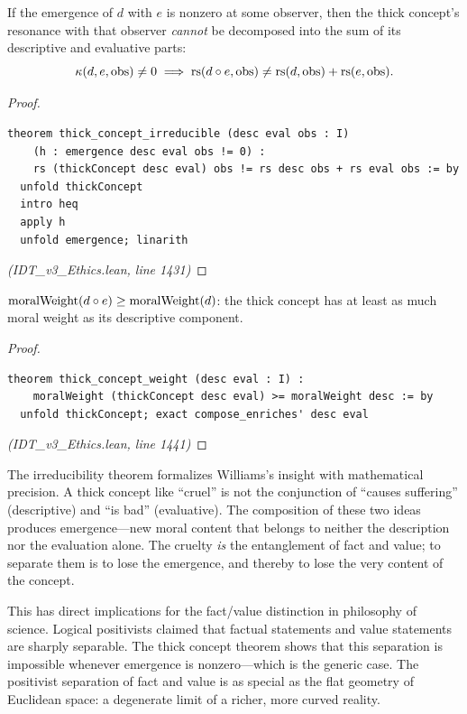 \begin{theorem}
\label{thm:thick-irreducible}
If the emergence of $d$ with $e$ is nonzero at some observer, then the thick
concept's resonance with that observer \emph{cannot} be decomposed into the
sum of its descriptive and evaluative parts:
\[
  \kappa(d, e, \mathrm{obs}) \neq 0 \implies
  \mathrm{rs}(d \circ e, \mathrm{obs}) \neq \mathrm{rs}(d, \mathrm{obs}) + \mathrm{rs}(e, \mathrm{obs}).
\]
\end{theorem}

\begin{proof}
\begin{lstlisting}
theorem thick_concept_irreducible (desc eval obs : I)
    (h : emergence desc eval obs != 0) :
    rs (thickConcept desc eval) obs != rs desc obs + rs eval obs := by
  unfold thickConcept
  intro heq
  apply h
  unfold emergence; linarith
\end{lstlisting}
\textit{(IDT\_v3\_Ethics.lean, line 1431)}
\end{proof}

\begin{theorem}
\label{thm:thick-weight}
$\mathrm{moralWeight}(d \circ e) \geq \mathrm{moralWeight}(d)$: the thick
concept has at least as much moral weight as its descriptive component.
\end{theorem}

\begin{proof}
\begin{lstlisting}
theorem thick_concept_weight (desc eval : I) :
    moralWeight (thickConcept desc eval) >= moralWeight desc := by
  unfold thickConcept; exact compose_enriches' desc eval
\end{lstlisting}
\textit{(IDT\_v3\_Ethics.lean, line 1441)}
\end{proof}

\begin{interpretation}
The irreducibility theorem formalizes Williams's insight with mathematical
precision. A thick concept like ``cruel'' is not the conjunction of
``causes suffering'' (descriptive) and ``is bad'' (evaluative). The
composition of these two ideas produces emergence---new moral content that
belongs to neither the description nor the evaluation alone. The cruelty
\emph{is} the entanglement of fact and value; to separate them is to lose
the emergence, and thereby to lose the very content of the concept.

This has direct implications for the fact/value distinction in philosophy
of science. Logical positivists claimed that factual statements and value
statements are sharply separable. The thick concept theorem shows that
this separation is impossible whenever emergence is nonzero---which is
the generic case. The positivist separation of fact and value is as
special as the flat geometry of Euclidean space: a degenerate limit
of a richer, more curved reality.
\end{interpretation}




